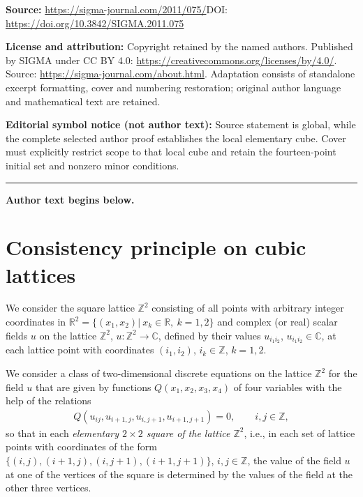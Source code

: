 \documentclass[11pt]{article}
\begin{document}
\noindent\textbf{Source:} \url{https://sigma-journal.com/2011/075/}\quad DOI: \url{https://doi.org/10.3842/SIGMA.2011.075}\par
\noindent\textbf{License and attribution:} Copyright retained by the named authors. Published by SIGMA under CC BY 4.0: \url{https://creativecommons.org/licenses/by/4.0/}. Source: \url{https://sigma-journal.com/about.html}. Adaptation consists of standalone excerpt formatting, cover and numbering restoration; original author language and mathematical text are retained.\par
\noindent\textbf{Editorial symbol notice (not author text):} Source statement is global, while the complete selected author proof establishes the local elementary cube. Cover must explicitly restrict scope to that local cube and retain the fourteen-point initial set and nonzero minor conditions.\par
\medskip\hrule\medskip\noindent\textbf{Author text begins below.}\par
\setcounter{section}{1}
\setcounter{subsection}{0}
\setcounter{subsubsection}{0}
\setcounter{equation}{0}
\section{Consistency principle on cubic lattices}


We consider the square lattice $\mathbb{Z}^2$ consisting of all points
with arbitrary integer coordinates in $\mathbb{R}^2 = \{ (x_1, x_2)| \ x_k \in
\mathbb{R},\ k =1, 2 \}$ and complex (or real) scalar f\/ields $u$ on
the lattice $\mathbb{Z}^2$, $u : \mathbb{Z}^2 \rightarrow
\mathbb{C}$, def\/ined by their values $u_{i_1 i_2}$, $u_{i_1 i_2} \in
\mathbb{C}$, at each lattice point with coordinates $(i_1, i_2)$,
$i_k \in \mathbb{Z}$, $k = 1, 2$.




We consider a class of two-dimensional discrete equations on the
lattice $\mathbb{Z}^2$ for the f\/ield $u$ that are given by functions
$Q (x_1, x_2, x_3, x_4)$ of four variables with the help of the
relations
\begin{gather} Q (u_{i j}, u_{i + 1, j}, u_{i, j + 1}, u_{i + 1, j +
1}) = 0, \qquad i, j \in \mathbb{Z}, \label{1}
\end{gather}
so that in each
{\it elementary $2 \times 2$ square of the lattice $\mathbb{Z}^2$},
i.e., in each set of lattice points with coordinates of the form
$\{(i, j), (i + 1, j), (i, j + 1), (i + 1, j + 1)\}$, $i, j \in
\mathbb{Z}$, the value of the f\/ield $u$ at one of the vertices of
the square is determined by the values of the f\/ield at the other
three vertices.
\end{document}
